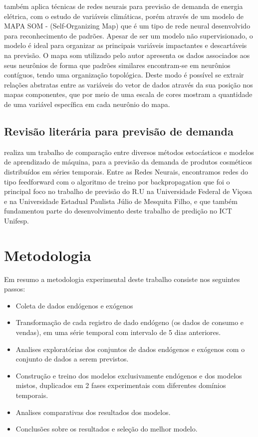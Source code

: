\documentclass[	12pt, Times, openright, twoside, a4paper, english, brazil]{abntex2}
\begin{document}
       \cite{Silva2010} também aplica técnicas de redes neurais para previsão de demanda de energia elétrica, com o estudo de variáveis climáticas, porém através de um modelo de MAPA SOM - (Self-Organizing Map) que é um tipo de rede neural desenvolvido para reconhecimento de padrões. Apesar de ser um modelo não supervisionado, o modelo é ideal para organizar as principais variáveis impactantes e descartáveis na previsão. O mapa som utilizado pelo autor apresenta os dados associados aos seus neurônios de forma que padrões similares encontram-se em neurônios contíguos, tendo uma organização topológica. Deste modo é possível se extrair relações abstratas entre as variáveis do vetor de dados através da sua posição nos mapas componentes, que por meio de uma escala de cores mostram a quantidade de uma variável específica em cada neurônio do mapa.
       
       \section{Revisão literária para previsão de demanda}
        \cite{Junior2007} realiza um trabalho de comparação entre diversos métodos estocásticos e modelos de aprendizado de máquina, para a previsão da demanda de produtos cosméticos distribuídos em séries temporais. Entre as Redes Neurais, encontramos redes do tipo feedforward com o algoritmo de treino por backpropagation que foi o principal foco no trabalho de previsão do R.U na Universidade Federal de Viçosa e na Universidade Estadual Paulista Júlio de Mesquita Filho, e que também fundamentou parte do desenvolvimento deste trabalho de predição no ICT Unifesp.
  \chapter{Metodologia}
    Em resumo a metodologia experimental deste trabalho consiste nos seguintes passos:
    \begin{itemize}
        \item Coleta de dados endógenos e exógenos
        \item Transformação de cada registro de dado endógeno (os dados de consumo e vendas), em uma série temporal com intervalo de 5 dias anteriores.
        \item Analises exploratórias dos conjuntos de dados endógenos e exógenos com o conjunto de dados a serem previstos.
        \item Construção e treino dos modelos exclusivamente endógenos e dos modelos mistos, duplicados em 2 fases experimentais com diferentes domínios temporais.
        \item Analises comparativas dos resultados dos modelos.
        \item Conclusões sobre os resultados e seleção do melhor modelo.
    \end{itemize}
    
\end{document}
